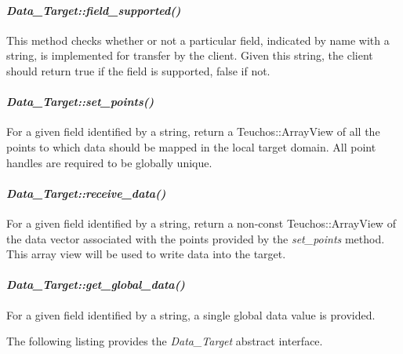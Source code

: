 \documentclass[letterpaper]{article}
\begin{document}
\paragraph{\sl Data\_Target::field\_supported()}
This method checks whether or not a particular field, indicated by
name with a string, is implemented for transfer by the client. Given
this string, the client should return true if the field is supported,
false if not.

\paragraph{\sl Data\_Target::set\_points()}
For a given field identified by a string, return a Teuchos::ArrayView
of all the points to which data should be mapped in the local target
domain. All point handles are required to be globally unique.

\paragraph{\sl Data\_Target::receive\_data()}
For a given field identified by a string, return a non-const
Teuchos::ArrayView of the data vector associated with the points
provided by the {\sl set\_points} method. This array view will be used
to write data into the target.

\paragraph{\sl Data\_Target::get\_global\_data()}
For a given field identified by a string, a single global data value
is provided.

The following listing provides the {\sl Data\_Target} abstract
interface. 
\end{document}
